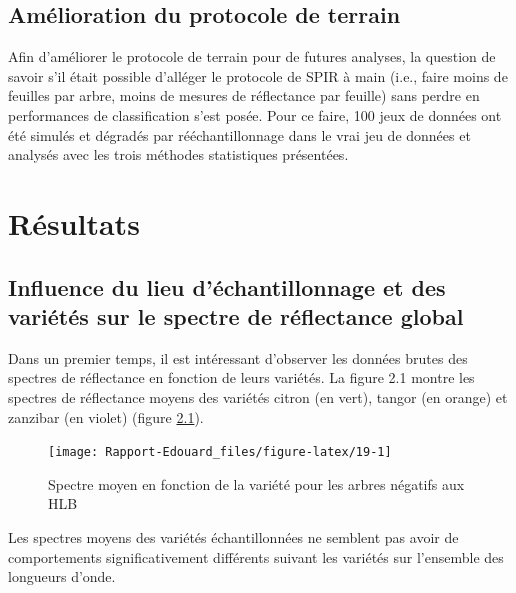 \documentclass[
  11pt,
  french,
  a4paper,
  extrafontsizes,onecolumn,openright
  ]{memoir}
\begin{document}
\hypertarget{amuxe9lioration-du-protocole-de-terrain}{%
\section{Amélioration du protocole de terrain}\label{amuxe9lioration-du-protocole-de-terrain}}

Afin d'améliorer le protocole de terrain pour de futures analyses, la question de savoir s'il était possible d'alléger le protocole de SPIR à main (i.e., faire moins de feuilles par arbre, moins de mesures de réflectance par feuille) sans perdre en performances de classification s'est posée. Pour ce faire, 100 jeux de données ont été simulés et dégradés par rééchantillonnage dans le vrai jeu de données et analysés avec les trois méthodes statistiques présentées.

\hypertarget{ruxe9sultats}{%
\chapter{Résultats}\label{ruxe9sultats}}

\hypertarget{influence-du-lieu-duxe9chantillonnage-et-des-variuxe9tuxe9s-sur-le-spectre-de-ruxe9flectance-global}{%
\section{Influence du lieu d'échantillonnage et des variétés sur le spectre de réflectance global}\label{influence-du-lieu-duxe9chantillonnage-et-des-variuxe9tuxe9s-sur-le-spectre-de-ruxe9flectance-global}}

Dans un premier temps, il est intéressant d'observer les données brutes des spectres de réflectance en fonction de leurs variétés.
La figure 2.1 montre les spectres de réflectance moyens des variétés citron (en vert), tangor (en orange) et zanzibar (en violet) (figure \ref{fig:19}).

\scriptsize

\begin{figure}

{\centering \texttt{[image: Rapport-Edouard\_files/figure-latex/19-1]} 

}

\caption{Spectre moyen en fonction de la variété pour les arbres négatifs aux HLB}\label{fig:19}
\end{figure}

\normalsize

Les spectres moyens des variétés échantillonnées ne semblent pas avoir de comportements significativement différents suivant les variétés sur l'ensemble des longueurs d'onde.
\end{document}
